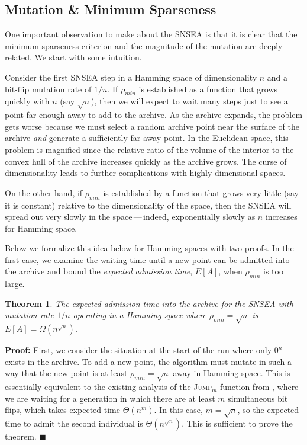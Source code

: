 \documentclass[twoside]{article}
\newtheorem{theorem}{Theorem}
\begin{document}
\subsection{Mutation \& Minimum Sparseness}
\label{subsec:mutation}
One important observation to make about the SNSEA is that it is clear that the minimum sparseness criterion and the magnitude of the mutation are deeply related.  We start with some intuition.

Consider the first SNSEA step in a Hamming space of dimensionality $n$ and a bit-flip mutation rate of $1/n$.  If $\rho_{min}$ is established as a function that grows quickly with $n$ (say $\sqrt{n}$), then we will expect to wait many steps just to see a point far enough away to add to the archive.  As the archive expands, the problem gets worse because we must select a random archive point near the surface of the archive \emph{and} generate a sufficiently far away point.  In the Euclidean space, this problem is magnified since the relative ratio of the volume of the interior to the convex hull of the archive increases quickly as the archive grows.  The curse of dimensionality leads to further complications with highly dimensional spaces.

On the other hand, if $\rho_{min}$ is established by a function that grows very little (say it is constant) relative to the dimensionality of the space, then the SNSEA will spread out very slowly in the space\,---\,indeed, exponentially slowly as $n$ increases for Hamming space.  

Below we formalize this idea below for Hamming spaces with two proofs.  In the first case, we examine the waiting time until a new point can be admitted into the archive and bound the \emph{expected admission time}, $E[A]$, when $\rho_{min}$ is too large.  

\begin{theorem}
The expected admission time into the archive for the SNSEA with mutation rate $1/n$ operating in a Hamming space where $\rho_{min} = \sqrt{n}$ is $E[A] = \Omega(n^{\sqrt{n}})$.
\end{theorem}
\textbf{Proof:} First, we consider the situation at the start of the run where only $0^n$ exists in the archive.  To add a new point, the algorithm must mutate in such a way that the new point is at least $\rho_{min} = \sqrt{n}$ away in Hamming space.  This is essentially equivalent to the existing analysis of the \textsc{Jump}$_m$ function from \cite{Droste1998tr}, where we are waiting for a generation in which there are at least $m$ simultaneous bit flips, which takes expected time $\Theta(n^m)$.  In this case, $m = \sqrt{n}$, so the expected time to admit the second individual is $\Theta(n^{\sqrt{n}})$.  This is sufficient to prove the theorem. $\blacksquare$
\end{document}
